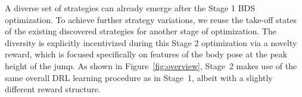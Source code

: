 A diverse set of strategies can already emerge after the Stage 1 BDS optimization. To achieve further strategy variations, we reuse the take-off states of the existing discovered strategies for another stage of optimization. The diversity is explicitly incentivized during this Stage 2 optimization via a novelty reward, which is focused specifically on features of the body pose at the peak height of the jump. As shown in Figure~\ref{fig:overview}, Stage~2 makes use of the same overall DRL learning procedure as in Stage~1, albeit with a slightly different reward structure.


